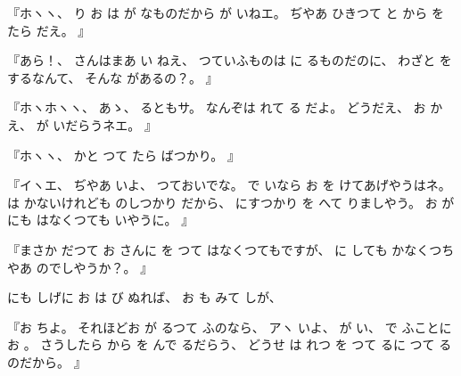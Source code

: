 『ホヽヽ、
%
り
お
は
が
なものだから
が
いねエ。
%
ぢやあ
ひきつて
と
から
を
たら
だえ。
』

『あら！、
%
さんはまあ
い
ねえ、
%
つていふものは
に
るものだのに、
%
わざと
をするなんて、
%
そんな
があるの？。
』

『ホヽホヽヽ、
%
あゝ、
%
るともサ。
%
なんぞは
れて
る
だよ。
%
どうだえ、
%
お
かえ、
%
が
いだらうネエ。
』

『ホヽヽ、
%
かと
つて
たら
ばつかり。
』

『イヽエ、
%
ぢやあ
いよ、
%
つておいでな。
%
で
いなら
お
を
けてあげやうはネ。
%
は
かないけれども
のしつかり
だから、
%
にすつかり
を
へて
りましやう。
%
お
が
にも
はなくつても
いやうに。
』

『まさか
だつて
お
さんに
を
つて
はなくつてもですが、
%
に
しても
かなくつちやあ
のでしやうか？。
』

にも
しげに
お
は
び
ぬれば、
%
お
も
みて
しが、

『お
ちよ。
%
それほどお
が
るつて
ふのなら、
%
アヽ
いよ、
%
が
い、
%
で
ふことに
お
。
%
さうしたら
から
を
んで
るだらう、
%
どうせ
は
れつ
を
つて
るに
つて
るのだから。
』


